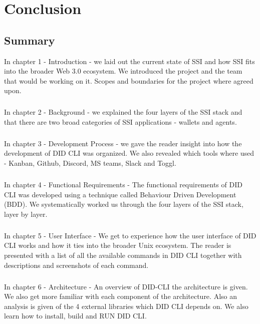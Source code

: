 \hypertarget{conclusion}{%
\chapter{Conclusion}\label{conclusion}}

\section{Summary}

In chapter 1 - Introduction - we laid out the current state of SSI and how SSI fits into the broader Web 3.0 ecosystem. We introduced the project and the team that would be working on it. Scopes and boundaries for the project where agreed upon.


\paragraph{}

In chapter 2 - Background - we explained the four layers of the SSI stack and that there are two broad categories of SSI applications - wallets and agents.


\paragraph{}
In chapter 3 - Development Process - we gave the reader insight into how the development of DID CLI was organized. We also revealed which tools where used - Kanban, Github, Discord, MS teams, Slack and Toggl.

  
\paragraph{}
In chapter 4 - Functional Requirements - The functional requirements of DID CLI was developed using a technique called Behaviour Driven Development (BDD). We systematically worked us through the four layers of the SSI stack, layer by layer.
  
  
\paragraph{}
In chapter 5 - User Interface - We get to experience how the user interface of DID CLI works and how it ties into the broader Unix ecosystem. The reader is presented with a list of all the available commands in DID CLI together with descriptions and screenshots of each command.


\paragraph{}
In chapter 6 - Architecture - An overview of DID-CLI the architecture is given. We also get more familiar with each component of the architecture. Also an analysis is given of the 4 external libraries which DID CLI depends on. We also learn how to install, build and RUN DID CLI. 


